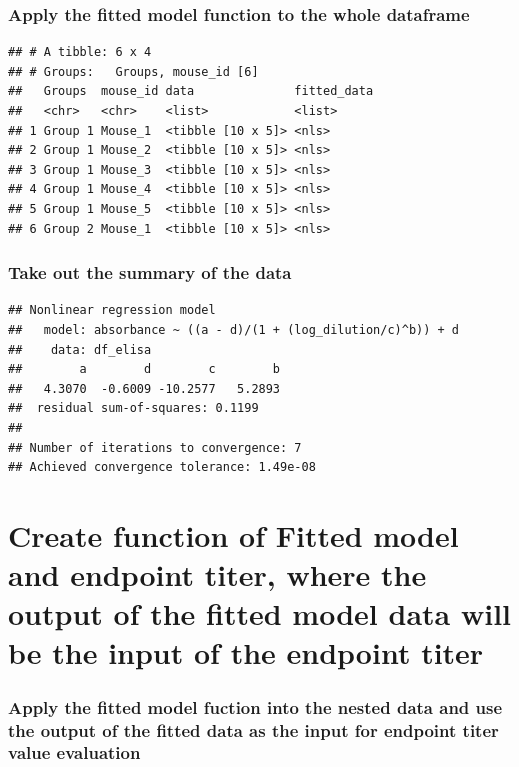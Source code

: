 \documentclass[
]{book}
\begin{document}
\hypertarget{apply-the-fitted-model-function-to-the-whole-dataframe}{%
\subsubsection{Apply the fitted model function to the whole dataframe}\label{apply-the-fitted-model-function-to-the-whole-dataframe}}

\begin{verbatim}
## # A tibble: 6 x 4
## # Groups:   Groups, mouse_id [6]
##   Groups  mouse_id data              fitted_data
##   <chr>   <chr>    <list>            <list>     
## 1 Group 1 Mouse_1  <tibble [10 x 5]> <nls>      
## 2 Group 1 Mouse_2  <tibble [10 x 5]> <nls>      
## 3 Group 1 Mouse_3  <tibble [10 x 5]> <nls>      
## 4 Group 1 Mouse_4  <tibble [10 x 5]> <nls>      
## 5 Group 1 Mouse_5  <tibble [10 x 5]> <nls>      
## 6 Group 2 Mouse_1  <tibble [10 x 5]> <nls>
\end{verbatim}

\hypertarget{take-out-the-summary-of-the-data}{%
\subsubsection{Take out the summary of the data}\label{take-out-the-summary-of-the-data}}

\begin{verbatim}
## Nonlinear regression model
##   model: absorbance ~ ((a - d)/(1 + (log_dilution/c)^b)) + d
##    data: df_elisa
##        a        d        c        b 
##   4.3070  -0.6009 -10.2577   5.2893 
##  residual sum-of-squares: 0.1199
## 
## Number of iterations to convergence: 7 
## Achieved convergence tolerance: 1.49e-08
\end{verbatim}

\hypertarget{create-function-of-fitted-model-and-endpoint-titer-where-the-output-of-the-fitted-model-data-will-be-the-input-of-the-endpoint-titer}{%
\section{Create function of Fitted model and endpoint titer, where the output of the fitted model data will be the input of the endpoint titer}\label{create-function-of-fitted-model-and-endpoint-titer-where-the-output-of-the-fitted-model-data-will-be-the-input-of-the-endpoint-titer}}

\hypertarget{apply-the-fitted-model-fuction-into-the-nested-data-and-use-the-output-of-the-fitted-data-as-the-input-for-endpoint-titer-value-evaluation}{%
\subsubsection{Apply the fitted model fuction into the nested data and use the output of the fitted data as the input for endpoint titer value evaluation}\label{apply-the-fitted-model-fuction-into-the-nested-data-and-use-the-output-of-the-fitted-data-as-the-input-for-endpoint-titer-value-evaluation}}
\end{document}
